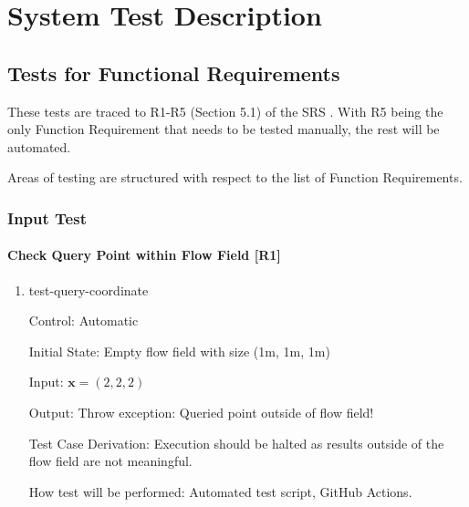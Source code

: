 \documentclass[12pt, titlepage]{article}
\begin{document}

\newpage
\section{System Test Description}
	
\subsection{Tests for Functional Requirements} \label{FuncTest}

These tests are traced to R1-R5 (Section 5.1) of the SRS \citet{SRS}. With R5 being the only Function Requirement that needs to be tested manually, the rest will be automated. 

Areas of testing are structured with respect to the list of Function Requirements.



\subsubsection{Input Test} \label{InputTest}


		
\paragraph{Check Query Point within Flow Field [R1]}

\begin{enumerate}

\item{test-query-coordinate\\}

Control: Automatic
					
Initial State: Empty flow field with size (1m, 1m, 1m)
					
Input: $\mathbf{x}=(2,2,2)$
					
Output: Throw exception: Queried point outside of flow field!

Test Case Derivation: Execution should be halted as results outside of the flow field are not meaningful.
					
How test will be performed: Automated test script, GitHub Actions.

\end{enumerate}
\end{document}
